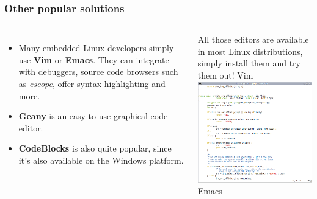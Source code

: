 \begin{frame}
  \frametitle{Other popular solutions}
  \begin{columns}[T]
    \begin{itemize}
    \item Many embedded Linux developers simply use {\bf Vim} or {\bf
        Emacs}. They can integrate with debuggers, source code browsers
      such as {\em cscope}, offer syntax highlighting and more.
    \item {\bf Geany} is an easy-to-use graphical code editor.
    \item {\bf CodeBlocks} is also quite popular, since it's also
      available on the Windows platform.
    \end{itemize}
    All those editors are available in most Linux distributions, simply
    install them and try them out!
    {\small Vim \\
    \includegraphics[height=0.38\textheight]{slides/sysdev-application-development/vim-screenshot.png}\\
    Emacs \\
}
\end{columns}
\end{frame}
